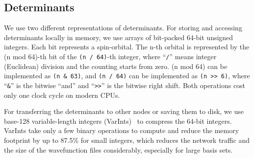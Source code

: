 \documentclass[%
reprint,
 superscriptaddress,
 amsmath,amssymb,
 aps,
]{revtex4-1}
\begin{document}
\subsection{Determinants}
\label{{sec:det}}
%
%

We use two different representations of determinants.
For storing and accessing determinants locally in memory, we use arrays of bit-packed 64-bit unsigned integers.
Each bit represents a spin-orbital.
The n-th orbital is represented by the (n mod 64)-th bit of
the \lstinline{(n / 64)}-th integer, where ``\lstinline{/}'' means integer (Euclidean) division and the counting starts from zero.
(n mod 64) can be implemented as \lstinline{(n & 63)}, and \lstinline{(n / 64)} can be implemented as \lstinline{(n >> 6)}, where ``\lstinline{&}'' is the bitwise ``and'' and ``\lstinline{>>}'' is the bitwise right shift.
Both operations cost only one clock cycle on modern CPUs.

For transferring the determinants to other nodes or saving them to disk, we use base-128 variable-length integers
(VarInts)~\cite{StuFer-Protobuf-12} to compress the 64-bit integers.
VarInts take only a few binary operations to compute and reduce the memory footprint by up to 87.5\% for small integers, which reduces the network traffic and the size of the wavefunction files considerably, especially for large basis sets.
\end{document}
